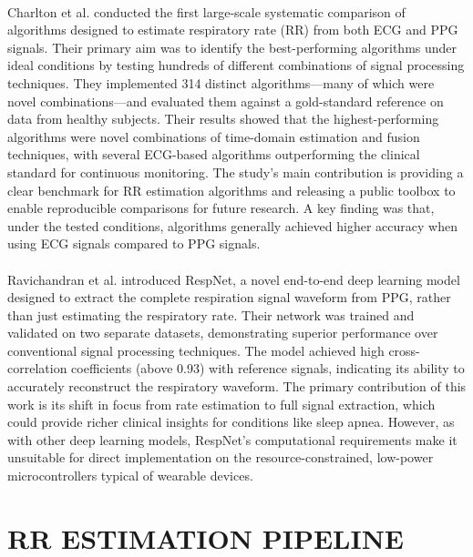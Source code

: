 \documentclass[12pt,a4paper]{report}
\begin{document}
\\
Charlton et al.\cite{charlton2016assessment} conducted the first large-scale systematic comparison of algorithms designed to estimate respiratory rate (RR) from both ECG and PPG signals. Their primary aim was to identify the best-performing algorithms under ideal conditions by testing hundreds of different combinations of signal processing techniques. They implemented 314 distinct algorithms—many of which were novel combinations—and evaluated them against a gold-standard reference on data from healthy subjects. Their results showed that the highest-performing algorithms were novel combinations of time-domain estimation and fusion techniques, with several ECG-based algorithms outperforming the clinical standard for continuous monitoring. The study's main contribution is providing a clear benchmark for RR estimation algorithms and releasing a public toolbox to enable reproducible comparisons for future research. A key finding was that, under the tested conditions, algorithms generally achieved higher accuracy when using ECG signals compared to PPG signals.\\
\\
Ravichandran et al.\cite{ravichandran2019respnet} introduced RespNet, a novel end-to-end deep learning model designed to extract the complete respiration signal waveform from PPG, rather than just estimating the respiratory rate. Their network was trained and validated on two separate datasets, demonstrating superior performance over conventional signal processing techniques. The model achieved high cross-correlation coefficients (above 0.93) with reference signals, indicating its ability to accurately reconstruct the respiratory waveform. The primary contribution of this work is its shift in focus from rate estimation to full signal extraction, which could provide richer clinical insights for conditions like sleep apnea. However, as with other deep learning models, RespNet's computational requirements make it unsuitable for direct implementation on the resource-constrained, low-power microcontrollers typical of wearable devices.\\




\chapter{\Large{RR ESTIMATION PIPELINE}}
\end{document}
